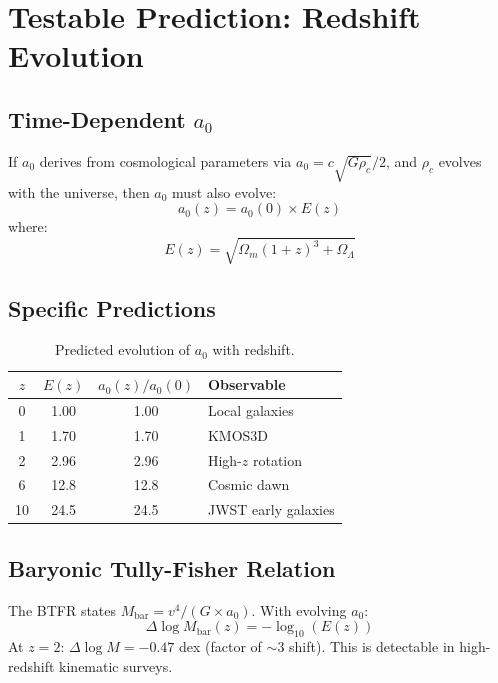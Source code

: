 \documentclass[twocolumn,showpacs,preprintnumbers,amsmath,amssymb,prd]{revtex4-2}
\begin{document}
\section{Testable Prediction: Redshift Evolution}

\subsection{Time-Dependent $a_0$}

If $a_0$ derives from cosmological parameters via $a_0 = c\sqrt{G\rho_c}/2$, and $\rho_c$ evolves with the universe, then $a_0$ must also evolve:
\begin{equation}
a_0(z) = a_0(0) \times E(z)
\label{eq:evolution}
\end{equation}
where:
\begin{equation}
E(z) = \sqrt{\Omega_m(1+z)^3 + \Omega_\Lambda}
\end{equation}

\subsection{Specific Predictions}

\begin{table}[h]
\begin{tabular}{|c|c|c|l|}
\hline
$z$ & $E(z)$ & $a_0(z)/a_0(0)$ & Observable \\
\hline
0 & 1.00 & 1.00 & Local galaxies \\
1 & 1.70 & 1.70 & KMOS3D \\
2 & 2.96 & 2.96 & High-$z$ rotation \\
6 & 12.8 & 12.8 & Cosmic dawn \\
10 & 24.5 & 24.5 & JWST early galaxies \\
\hline
\end{tabular}
\caption{Predicted evolution of $a_0$ with redshift.}
\label{tab:evolution}
\end{table}

\subsection{Baryonic Tully-Fisher Relation}

The BTFR states $M_{\text{bar}} = v^4/(G \times a_0)$. With evolving $a_0$:
\begin{equation}
\Delta\log M_{\text{bar}}(z) = -\log_{10}(E(z))
\end{equation}
At $z = 2$: $\Delta\log M = -0.47$ dex (factor of $\sim$3 shift). This is detectable in high-redshift kinematic surveys.
\end{document}

